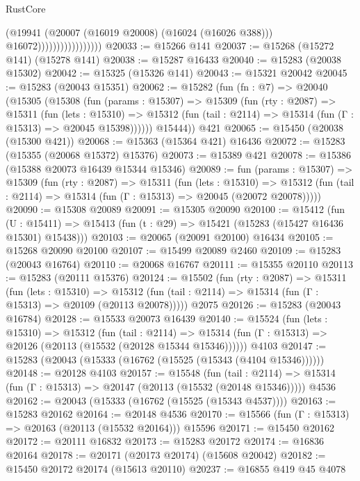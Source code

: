 \begin{lexlean}{RustCore}
\begin{coremodule}
                                    (@19941
                                      (@20007 (@16019 @20008) (@16024 (@16026 @388)))
                                      @16072)))))))))))))))))
@20033 := @15266 @141
@20037 := @15268 (@15272 @141) (@15278 @141)
@20038 := @15287 @16433
@20040 := @15283 (@20038 @15302)
@20042 := @15325 (@15326 @141)
@20043 := @15321 @20042
@20045 := @15283 (@20043 @15351)
@20062 := @15282
    (fun (fn : @7) =>
    @20040
      (@15305
        (@15308
          (fun (params : @15307) =>
          @15309
            (fun (rty : @2087) =>
            @15311
              (fun (lets : @15310) =>
              @15312 (fun (tail : @2114) => @15314 (fun (Γ : @15313) => @20045 @15398))))))
        @15444))
    @421
@20065 := @15450 (@20038 (@15300 @421))
@20068 := @15363 (@15364 @421) @16436
@20072 := @15283 (@15355 (@20068 @15372) @15376)
@20073 := @15389 @421
@20078 := @15386 (@15388 @20073 @16439 @15344 @15346)
@20089 := fun (params : @15307) =>
  @15309
    (fun (rty : @2087) =>
    @15311
      (fun (lets : @15310) =>
      @15312 (fun (tail : @2114) => @15314 (fun (Γ : @15313) => @20045 (@20072 @20078)))))
@20090 := @15308 @20089
@20091 := @15305 @20090
@20100 := @15412
    (fun (U : @15411) => @15413 (fun (t : @29) => @15421 (@15283 (@15427 @16436 @15301) @15438)))
@20103 := @20065 (@20091 @20100) @16434
@20105 := @15268 @20090 @20100
@20107 := @15499 @20089 @2460
@20109 := @15283 (@20043 @16764)
@20110 := @20068 @16767
@20111 := @15355 @20110
@20113 := @15283 (@20111 @15376)
@20124 := @15502
    (fun (rty : @2087) =>
    @15311
      (fun (lets : @15310) =>
      @15312 (fun (tail : @2114) => @15314 (fun (Γ : @15313) => @20109 (@20113 @20078)))))
    @2075
@20126 := @15283 (@20043 @16784)
@20128 := @15533 @20073 @16439
@20140 := @15524
    (fun (lets : @15310) =>
    @15312
      (fun (tail : @2114) =>
      @15314 (fun (Γ : @15313) => @20126 (@20113 (@15532 (@20128 @15344 @15346))))))
    @4103
@20147 := @15283 (@20043 (@15333 (@16762 (@15525 (@15343 (@4104 @15346))))))
@20148 := @20128 @4103
@20157 := @15548
    (fun (tail : @2114) => @15314 (fun (Γ : @15313) => @20147 (@20113 (@15532 (@20148 @15346)))))
    @4536
@20162 := @20043 (@15333 (@16762 (@15525 (@15343 @4537))))
@20163 := @15283 @20162
@20164 := @20148 @4536
@20170 := @15566 (fun (Γ : @15313) => @20163 (@20113 (@15532 @20164))) @15596
@20171 := @15450 @20162
@20172 := @20111 @16832
@20173 := @15283 @20172
@20174 := @16836 @20164
@20178 := @20171 (@20173 @20174) (@15608 @20042)
@20182 := @15450 @20172 @20174 (@15613 @20110)
@20237 := @16855
    @419
    @45
    @4078

\end{coremodule}
\end{lexlean}
